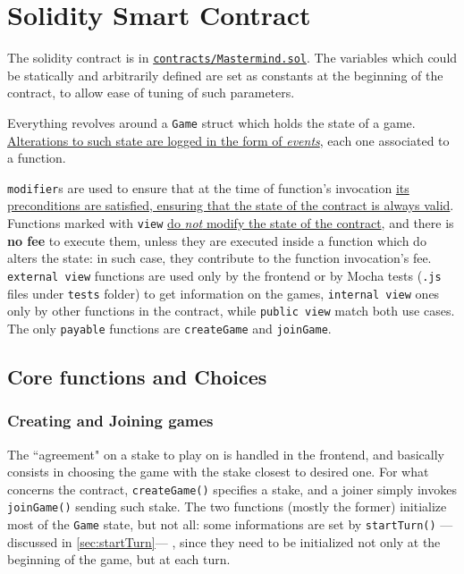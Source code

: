 \chapter{Solidity Smart Contract}
\label{sec:solidity_contract}

The solidity contract is in \href{https://github.com/frenzis01/mastermind/blob/400da112942becdf070796144fe0db0022c481b6/contracts/Mastermind.sol#L228}{\texttt{contracts/Mastermind.sol}}. 
The variables which could be statically and arbitrarily defined are set as constants at the beginning of the contract, to allow ease of tuning of such parameters.

Everything revolves around a \texttt{Game} struct which holds the state of a game.
\ul{Alterations to such state are logged in the form of \textit{events}}, each one associated to a function.

\lstinline{modifier}s are used to ensure that at the time of function's invocation \ul{its preconditions are satisfied, ensuring that the state of the contract is always valid}.
Functions marked with \lstinline{view} \ul{do \textit{not} modify the state of the contract}, and there is \textbf{no fee} to execute them, unless they are executed inside a function which do alters the state: in such case, they contribute to the function invocation's fee.
\lstinline{external view} functions are used only by the frontend or by Mocha tests (\texttt{.js} files under \texttt{tests} folder) to get information on the games, \lstinline{internal view} ones only by other functions in the contract, while \lstinline{public view} match both use cases.\\
The only \lstinline{payable} functions are \texttt{createGame} and \texttt{joinGame}.


\section{Core functions and Choices}
\label{sec:core-functions}

\subsection{Creating and Joining games}
\label{sec:create-join-games}
The ``agreement" on a stake to play on is handled in the frontend, and basically consists in choosing the game with the stake closest to desired one. 
For what concerns the contract, \texttt{createGame()} specifies a stake, and a joiner simply invokes \texttt{joinGame()} sending such stake.
The two functions (mostly the former) initialize most of the \texttt{Game} state, but not all: some informations are set by \texttt{startTurn()} ---discussed in \ref{sec:startTurn}--- , since they need to be initialized not only at the beginning of the game, but at each turn. 


